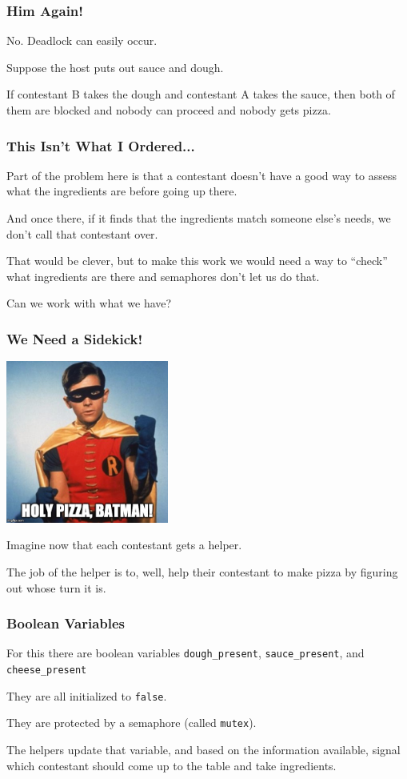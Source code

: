 \begin{frame}
	\frametitle{Him Again!}

	No. Deadlock can easily occur.

	Suppose the host puts out sauce and dough.

	If contestant B takes the dough and contestant A takes the sauce, then both of them are blocked and nobody can proceed and nobody gets pizza.

\end{frame}


\begin{frame}
	\frametitle{This Isn't What I Ordered...}

	Part of the problem here is that a contestant doesn't have a good way to assess what the ingredients are before going up there.

	And once there, if it finds that the ingredients match someone else's needs, we don't call that contestant over.

	That would be clever, but to make this work we would need a way to ``check'' what ingredients are there and semaphores don't let us do that.

	Can we work with what we have?

\end{frame}

\begin{frame}
	\frametitle{We Need a Sidekick!}
	\begin{center}
		\includegraphics[width=0.4\textwidth]{images/robin.jpg}
	\end{center}

	Imagine now that each contestant gets a helper.

	The job of the helper is to, well, help their contestant to make pizza by figuring out whose turn it is.

\end{frame}


\begin{frame}
	\frametitle{Boolean Variables}

	For this there are boolean variables \texttt{dough\_present}, \texttt{sauce\_present}, and \texttt{cheese\_present}

	They are all initialized to \texttt{false}.

	They are protected by a semaphore (called \texttt{mutex}).

	The helpers update that variable, and based on the information available, signal which contestant should come up to the table and take ingredients.

\end{frame}

